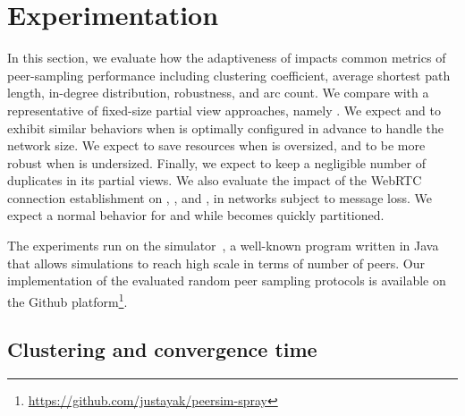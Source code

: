 \newcommand\SCALE{0.8}

\section{Experimentation}
\label{sec:experimentation}


In this section, we evaluate how the adaptiveness of \SPRAY impacts common
metrics of peer-sampling performance including clustering coefficient, average
shortest path length, in-degree distribution, robustness, and arc count. We
compare \SPRAY with a representative of fixed-size partial view approaches,
namely \CYCLON. We expect \SPRAY and \CYCLON to exhibit similar behaviors when
\CYCLON is optimally configured in advance to handle the network size. We expect
\SPRAY to save resources when \CYCLON is oversized, and to be more robust when
\CYCLON is undersized. Finally, we expect \SPRAY to keep a negligible number of
duplicates in its partial views. We also evaluate the impact of the WebRTC
connection establishment on \CYCLON, \SCAMP, and \SPRAY, in networks subject to
message loss.  We expect a normal behavior for \CYCLON and \SPRAY while \SCAMP
becomes quickly partitioned.

The experiments run on the \PEERSIM simulator~\cite{montresor2009peersim}, a
well-known program written in Java that allows simulations to reach high scale
in terms of number of peers. Our implementation of the evaluated random peer
sampling protocols is available on the Github
platform\footnote{\url{https://github.com/justayak/peersim-spray}}.


\subsection{Clustering and convergence time}

